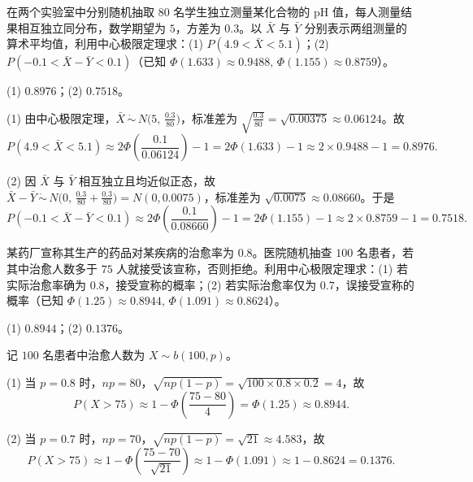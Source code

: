 \begin{exercise}
在两个实验室中分别随机抽取 $80$ 名学生独立测量某化合物的 $\mathrm{pH}$ 值，每人测量结果相互独立同分布，数学期望为 $5$，方差为 $0.3$。以 $\bar{X}$ 与 $\bar{Y}$ 分别表示两组测量的算术平均值，利用中心极限定理求：(1) $P(4.9<\bar{X}<5.1)$；(2) $P(-0.1<\bar{X}-\bar{Y}<0.1)$（已知 $\Phi(1.633)\approx 0.9488,\,\Phi(1.155)\approx 0.8759$）。
\begin{answer}
(1) $0.8976$；(2) $0.7518$。
\end{answer}
\begin{solution}
(1) 由中心极限定理，$\bar{X}\,\dot{\sim}\,N\bigl(5,\,\frac{0.3}{80}\bigr)$，标准差为 $\sqrt{\frac{0.3}{80}}=\sqrt{0.00375}\approx 0.06124$。故
\[
  P(4.9<\bar{X}<5.1)
  \approx 2\Phi\!\left(\frac{0.1}{0.06124}\right)-1
  =2\Phi(1.633)-1\approx 2\times 0.9488-1=0.8976.
\]

(2) 因 $\bar{X}$ 与 $\bar{Y}$ 相互独立且均近似正态，故 $\bar{X}-\bar{Y}\,\dot{\sim}\,N\bigl(0,\,\frac{0.3}{80}+\frac{0.3}{80}\bigr)=N(0,0.0075)$，标准差为 $\sqrt{0.0075}\approx 0.08660$。于是
\[
  P(-0.1<\bar{X}-\bar{Y}<0.1)
  \approx 2\Phi\!\left(\frac{0.1}{0.08660}\right)-1
  =2\Phi(1.155)-1\approx 2\times 0.8759-1=0.7518.
\]
\end{solution}
\end{exercise}

\begin{exercise}
某药厂宣称其生产的药品对某疾病的治愈率为 $0.8$。医院随机抽查 $100$ 名患者，若其中治愈人数多于 $75$ 人就接受该宣称，否则拒绝。利用中心极限定理求：(1) 若实际治愈率确为 $0.8$，接受宣称的概率；(2) 若实际治愈率仅为 $0.7$，误接受宣称的概率（已知 $\Phi(1.25)\approx 0.8944,\,\Phi(1.091)\approx 0.8624$）。
\begin{answer}
(1) $0.8944$；(2) $0.1376$。
\end{answer}
\begin{solution}
记 $100$ 名患者中治愈人数为 $X\sim b(100,p)$。

(1) 当 $p=0.8$ 时，$np=80$，$\sqrt{np(1-p)}=\sqrt{100\times 0.8\times 0.2}=4$，故
\[
  P(X>75)\approx 1-\Phi\!\left(\frac{75-80}{4}\right)=\Phi(1.25)\approx 0.8944.
\]

(2) 当 $p=0.7$ 时，$np=70$，$\sqrt{np(1-p)}=\sqrt{21}\approx 4.583$，故
\[
  P(X>75)\approx 1-\Phi\!\left(\frac{75-70}{\sqrt{21}}\right)\approx 1-\Phi(1.091)\approx 1-0.8624=0.1376.
\]
\end{solution}
\end{exercise}

